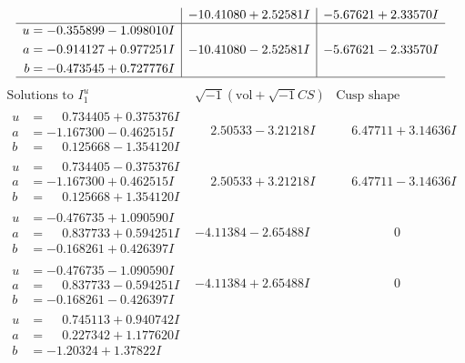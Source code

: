 \documentclass[1p]{elsarticle_modified}
\theoremstyle{definition}
\newcommand{\I}{\sqrt{-1}}
\begin{document}
$$\begin{array}{c|c|c}
 & -10.41080 + 2.52581 I & -5.67621 + 2.33570 I \\ \hline\begin{aligned}
u &= -0.355899 - 1.098010 I \\
a &= -0.914127 + 0.977251 I \\
b &= -0.473545 + 0.727776 I\end{aligned}
 & -10.41080 - 2.52581 I & -5.67621 - 2.33570 I\\
 \hline 
 \end{array}$$\newpage$$\begin{array}{c|c|c}  
\text{Solutions to }I^u_{1}& \I (\text{vol} + \sqrt{-1}CS) & \text{Cusp shape}\\
 \hline 
\begin{aligned}
u &= \phantom{-}0.734405 + 0.375376 I \\
a &= -1.167300 - 0.462515 I \\
b &= \phantom{-}0.125668 - 1.354120 I\end{aligned}
 & \phantom{-}2.50533 - 3.21218 I & \phantom{-}6.47711 + 3.14636 I \\ \hline\begin{aligned}
u &= \phantom{-}0.734405 - 0.375376 I \\
a &= -1.167300 + 0.462515 I \\
b &= \phantom{-}0.125668 + 1.354120 I\end{aligned}
 & \phantom{-}2.50533 + 3.21218 I & \phantom{-}6.47711 - 3.14636 I \\ \hline\begin{aligned}
u &= -0.476735 + 1.090590 I \\
a &= \phantom{-}0.837733 + 0.594251 I \\
b &= -0.168261 + 0.426397 I\end{aligned}
 & -4.11384 - 2.65488 I & \phantom{-0.000000 } 0 \\ \hline\begin{aligned}
u &= -0.476735 - 1.090590 I \\
a &= \phantom{-}0.837733 - 0.594251 I \\
b &= -0.168261 - 0.426397 I\end{aligned}
 & -4.11384 + 2.65488 I & \phantom{-0.000000 } 0 \\ \hline\begin{aligned}
u &= \phantom{-}0.745113 + 0.940742 I \\
a &= \phantom{-}0.227342 + 1.177620 I \\
b &= -1.20324 + 1.37822 I\end{aligned}

\end{array}$$
\end{document}
